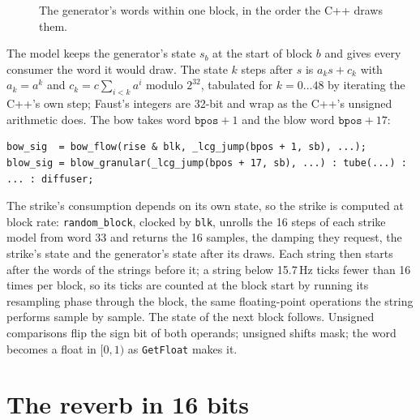 \documentclass[10pt,a4paper,twocolumn]{article}
\newcommand{\code}[1]{\texttt{#1}}
\begin{document}
\begin{figure}[t]
\centering
{}
\caption{The generator's words within one block, in the order the C++ draws them.}
\label{fig:words}
\end{figure}

The model keeps the generator's state $s_b$ at the start of block $b$ and gives every consumer the word it would draw. The state $k$ steps after $s$ is $a_k s + c_k$ with $a_k = a^k$ and $c_k = c\sum_{i<k} a^i$ modulo $2^{32}$, tabulated for $k = 0 \dots 48$ by iterating the C++'s own step; Faust's integers are 32-bit and wrap as the C++'s unsigned arithmetic does. The bow takes word $\code{bpos}+1$ and the blow word $\code{bpos}+17$:
\begin{lstlisting}
bow_sig  = bow_flow(rise & blk, _lcg_jump(bpos + 1, sb), ...);
blow_sig = blow_granular(_lcg_jump(bpos + 17, sb), ...) : tube(...) : ... : diffuser;
\end{lstlisting}
The strike's consumption depends on its own state, so the strike is computed at block rate: \code{random\_block}, clocked by \code{blk}, unrolls the 16 steps of each strike model from word 33 and returns the 16 samples, the damping they request, the strike's state and the generator's state after its draws. Each string then starts after the words of the strings before it; a string below 15.7\,Hz ticks fewer than 16 times per block, so its ticks are counted at the block start by running its resampling phase through the block, the same floating-point operations the string performs sample by sample. The state of the next block follows. Unsigned comparisons flip the sign bit of both operands; unsigned shifts mask; the word becomes a float in $[0,1)$ as \code{GetFloat} makes it.

\section{The reverb in 16 bits}
\label{sec:reverb}
\end{document}
